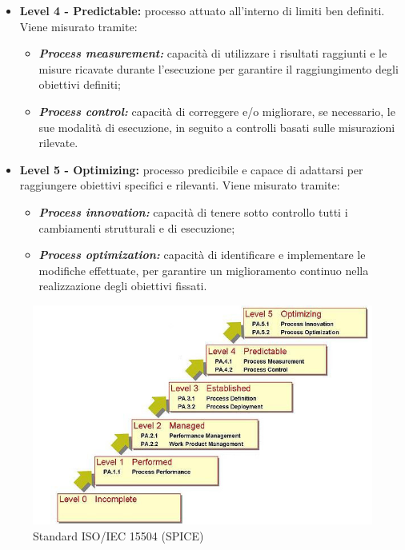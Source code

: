 \begin{itemize}
\begin{itemize}
		\end{itemize} 
		\item \textbf{Level 4 - Predictable:} processo attuato all’interno di limiti ben definiti. Viene misurato tramite:
		\begin{itemize}
			\item \textbf{\textit{Process measurement:}} capacità di utilizzare i risultati raggiunti e le misure ricavate durante l'esecuzione per garantire il raggiungimento degli obiettivi definiti;
			\item \textbf{\textit{Process control:}} capacità di correggere e/o migliorare, se necessario, le sue modalità di esecuzione, in seguito a controlli basati sulle misurazioni rilevate.
		\end{itemize}
		\item \textbf{Level 5 - Optimizing:} processo predicibile e capace di adattarsi per raggiungere obiettivi specifici e rilevanti. Viene misurato tramite:
		\begin{itemize}
			\item \textbf{\textit{Process innovation:}} capacità di tenere sotto controllo tutti i cambiamenti strutturali e di esecuzione;
			\item \textbf{\textit{Process optimization:}} capacità di identificare e implementare le modifiche effettuate, per garantire un miglioramento continuo nella realizzazione degli obiettivi fissati.
		\end{itemize}
	\end{itemize}

	\begin{figure}[H]
		\centering
		\includegraphics[scale=1.2]{includes/img/SPICE.jpg}
		\caption{Standard ISO/IEC 15504 (SPICE)}
	\end{figure}
	
